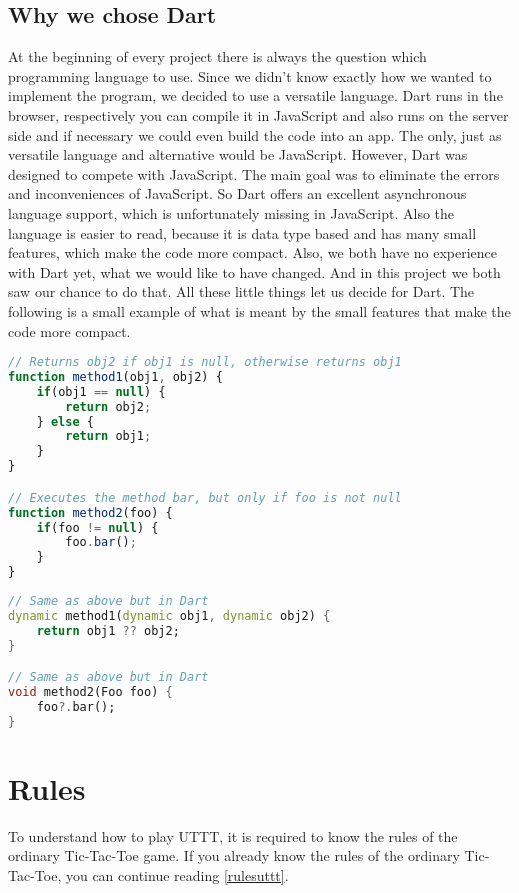 \subsection{Why we chose Dart}
At the beginning of every project there is always the question which programming language to use. Since we didn't know exactly how we wanted to implement the program, we decided to use a versatile language. Dart runs in the browser, respectively you can compile it in JavaScript and also runs on the server side and if necessary we could even build the code into an app. The only, just as versatile language and alternative would be JavaScript. However, Dart was designed to compete with JavaScript.  The main goal was to eliminate the errors and inconveniences of JavaScript. So Dart offers an excellent asynchronous language support, which is unfortunately missing in JavaScript. Also the language is easier to read, because it is data type based and has many small features, which make the code more compact. Also, we both have no experience with Dart yet, what we would like to have changed.  And in this project we both saw our chance to 
do that. All these little things let us decide for Dart. The following is a small example of what is meant by the small features that make the code more compact.

\begin{lstlisting}[language=JavaScript,caption={Example in JavaScript}]
// Returns obj2 if obj1 is null, otherwise returns obj1
function method1(obj1, obj2) {
	if(obj1 == null) {
		return obj2;
	} else {
		return obj1;
	}
}

// Executes the method bar, but only if foo is not null
function method2(foo) {
	if(foo != null) {
		foo.bar();
	}
}
\end{lstlisting}

\begin{lstlisting}[language=Dart,caption={Example in Dart}]
// Same as above but in Dart
dynamic method1(dynamic obj1, dynamic obj2) {
	return obj1 ?? obj2;
}

// Same as above but in Dart
void method2(Foo foo) {
	foo?.bar();
}
\end{lstlisting}

\section{Rules}
To understand how to play \ac{UTTT}, it is required to  know the rules of the ordinary Tic-Tac-Toe game. If you already know the rules of the ordinary Tic-Tac-Toe, you can continue reading \autoref{rulesuttt}. 

